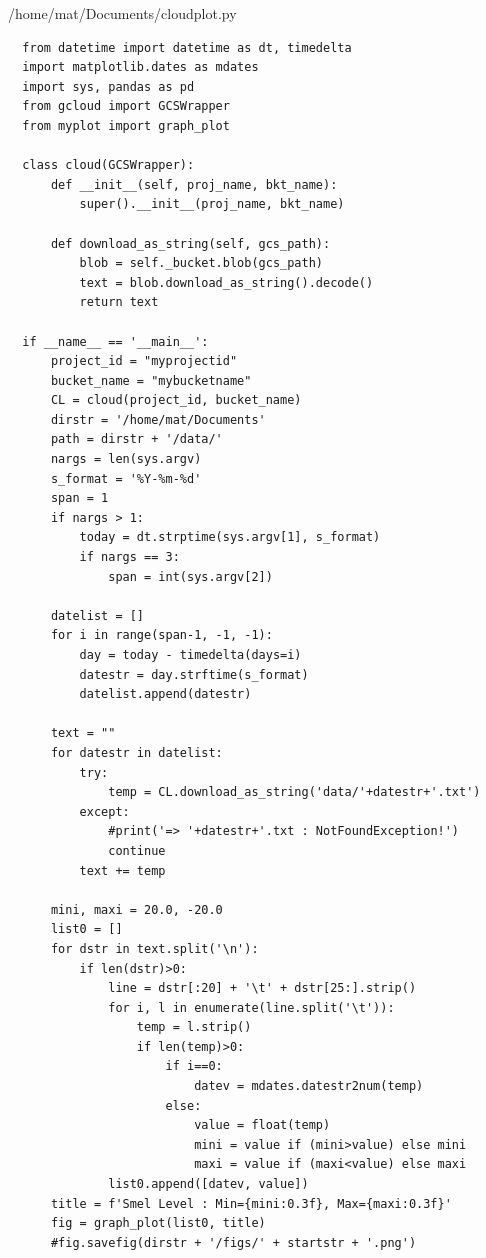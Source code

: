 \documentclass[12pt,a4j]{jsbook}
\begin{document}
\newpage

\begin{spacing}{0.8}
\begin{breakbox}[l]{/home/mat/Documents/cloudplot.py}
\begin{verbatim}
  from datetime import datetime as dt, timedelta
  import matplotlib.dates as mdates
  import sys, pandas as pd
  from gcloud import GCSWrapper
  from myplot import graph_plot

  class cloud(GCSWrapper):
      def __init__(self, proj_name, bkt_name):
          super().__init__(proj_name, bkt_name)

      def download_as_string(self, gcs_path):
          blob = self._bucket.blob(gcs_path)
          text = blob.download_as_string().decode()
          return text

  if __name__ == '__main__':
      project_id = "myprojectid"
      bucket_name = "mybucketname"
      CL = cloud(project_id, bucket_name)
      dirstr = '/home/mat/Documents'
      path = dirstr + '/data/'
      nargs = len(sys.argv)
      s_format = '%Y-%m-%d'
      span = 1
      if nargs > 1:
          today = dt.strptime(sys.argv[1], s_format)
          if nargs == 3:
              span = int(sys.argv[2])

      datelist = []
      for i in range(span-1, -1, -1):
          day = today - timedelta(days=i)
          datestr = day.strftime(s_format)
          datelist.append(datestr)

      text = ""
      for datestr in datelist:
          try:
              temp = CL.download_as_string('data/'+datestr+'.txt')
          except:
              #print('=> '+datestr+'.txt : NotFoundException!')
              continue
          text += temp

      mini, maxi = 20.0, -20.0
      list0 = []
      for dstr in text.split('\n'):
          if len(dstr)>0:
              line = dstr[:20] + '\t' + dstr[25:].strip()
              for i, l in enumerate(line.split('\t')):
                  temp = l.strip()
                  if len(temp)>0:
                      if i==0:
                          datev = mdates.datestr2num(temp)
                      else:
                          value = float(temp)
                          mini = value if (mini>value) else mini
                          maxi = value if (maxi<value) else maxi
              list0.append([datev, value])
      title = f'Smel Level : Min={mini:0.3f}, Max={maxi:0.3f}'
      fig = graph_plot(list0, title)
      #fig.savefig(dirstr + '/figs/' + startstr + '.png')
\end{verbatim}
\end{breakbox}
\end{spacing}
\end{document}

